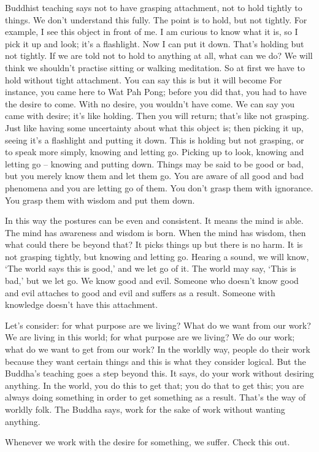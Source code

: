Buddhist teaching says not to have grasping attachment, not to hold tightly to things. We don't understand this fully. The point is to hold, but not tightly. For example, I see this object in front of me. I am curious to know what it is, so I pick it up and look; it's a flashlight. Now I can put it down. That's holding but not tightly. If we are told not to hold to anything at all, what can we do? We will think we shouldn't practise sitting or walking meditation. So at first we have to hold without tight attachment. You can say this is  but it will become  For instance, you came here to Wat Pah Pong; before you did that, you had to have the desire to come. With no desire, you wouldn't have come. We can say you came with desire; it's like holding. Then you will return; that's like not grasping. Just like having some uncertainty about what this object is; then picking it up, seeing it's a flashlight and putting it down. This is holding but not grasping, or to speak more simply, knowing and letting go. Picking up to look, knowing and letting go -- knowing and putting down. Things may be said to be good or bad, but you merely know them and let them go. You are aware of all good and bad phenomena and you are letting go of them. You don't grasp them with ignorance. You grasp them with wisdom and put them down.

In this way the postures can be even and consistent. It means the mind is able. The mind has awareness and wisdom is born. When the mind has wisdom, then what could there be beyond that? It picks things up but there is no harm. It is not grasping tightly, but knowing and letting go. Hearing a sound, we will know, `The world says this is good,' and we let go of it. The world may say, `This is bad,' but we let go. We know good and evil. Someone who doesn't know good and evil attaches to good and evil and suffers as a result. Someone with knowledge doesn't have this attachment.

Let's consider: for what purpose are we living? What do we want from our work? We are living in this world; for what purpose are we living? We do our work; what do we want to get from our work? In the worldly way, people do their work because they want certain things and this is what they consider logical. But the Buddha's teaching goes a step beyond this. It says, do your work without desiring anything. In the world, you do this to get that; you do that to get this; you are always doing something in order to get something as a result. That's the way of worldly folk. The Buddha says, work for the sake of work without wanting anything.

Whenever we work with the desire for something, we suffer. Check this out.
